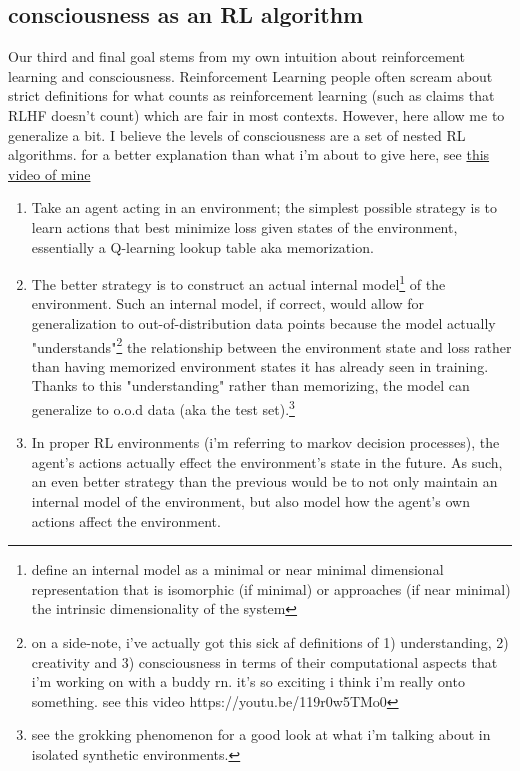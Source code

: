 \documentclass{article}
\begin{document}
\subsection{consciousness as an RL algorithm}
Our third and final goal stems from my own intuition about reinforcement learning and consciousness.
Reinforcement Learning people often scream about strict definitions for what counts as reinforcement learning (such as claims that RLHF doesn't count) which are fair in most contexts.
However, here allow me to generalize a bit.
I believe the levels of consciousness are a set of nested RL algorithms.
for a better explanation than what i'm about to give here, see \hyperlink{https://youtu.be/119r0w5TMo0}{this video of mine} 
\begin{enumerate}
    \item Take an agent acting in an environment; the simplest possible strategy is to learn actions that best minimize loss given states of the environment, essentially a Q-learning lookup table aka memorization.
    \item The better strategy is to construct an actual internal model\footnote{
        define an internal model as a minimal or near minimal dimensional representation that is isomorphic (if minimal) or approaches (if near minimal) the intrinsic dimensionality of the system
    } of the environment.
    Such an internal model, if correct, would allow for generalization to out-of-distribution data points because the model actually "understands"\footnote{
        on a side-note, i've actually got this sick af definitions of 1) understanding, 2) creativity and 3) consciousness in terms of their computational aspects that i'm working on with a buddy rn. it's so exciting i think i'm really onto something. see this video https://youtu.be/119r0w5TMo0
    } the relationship between the environment state and loss rather than having memorized environment states it has already seen in training. 
    Thanks to this "understanding" rather than memorizing, the model can generalize to o.o.d data (aka the test set).\footnote{
    see the grokking phenomenon for a good look at what i'm talking about in isolated synthetic environments.
    }
    \item In proper RL environments (i'm referring to markov decision processes), the agent's actions actually effect the environment's state in the future. 
    As such, an even better strategy than the previous would be to not only maintain an internal model of the environment, but also model how the agent's own actions affect the environment.

\end{enumerate}
\end{document}
